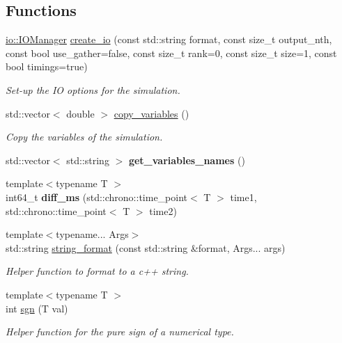 \subsection*{Functions}
\begin{DoxyCompactItemize}
\item 
\mbox{\hyperlink{classwash_1_1io_1_1IOManager}{io\+::\+I\+O\+Manager}} \mbox{\hyperlink{namespacewash_a92e4e768dbd609eba32fc0d68977d42f}{create\+\_\+io}} (const std\+::string format, const size\+\_\+t output\+\_\+nth, const bool use\+\_\+gather=false, const size\+\_\+t rank=0, const size\+\_\+t size=1, const bool timings=true)
\begin{DoxyCompactList}\small\item\em Set-\/up the IO options for the simulation. \end{DoxyCompactList}\item 
std\+::vector$<$ double $>$ \mbox{\hyperlink{namespacewash_afb1cc65bb4ecf6112723b4fb95450c96}{copy\+\_\+variables}} ()
\begin{DoxyCompactList}\small\item\em Copy the variables of the simulation. \end{DoxyCompactList}\item 
\mbox{\label{namespacewash_aebd88baa23220ce7842c503157c0bb71}} 
std\+::vector$<$ std\+::string $>$ {\bfseries get\+\_\+variables\+\_\+names} ()
\item 
\mbox{\label{namespacewash_a1c8fa60f6e44bc34cd82b152c9570603}} 
{\footnotesize template$<$typename T $>$ }\\int64\+\_\+t {\bfseries diff\+\_\+ms} (std\+::chrono\+::time\+\_\+point$<$ T $>$ time1, std\+::chrono\+::time\+\_\+point$<$ T $>$ time2)
\item 
{\footnotesize template$<$typename... Args$>$ }\\std\+::string \mbox{\hyperlink{namespacewash_a3c692ea6f1cb04614c790fd4b9dc34ba}{string\+\_\+format}} (const std\+::string \&format, Args... args)
\begin{DoxyCompactList}\small\item\em Helper function to format to a c++ string. \end{DoxyCompactList}\item 
{\footnotesize template$<$typename T $>$ }\\int \mbox{\hyperlink{namespacewash_a706d6d30508a81b6b9f25494cd759dff}{sgn}} (T val)
\begin{DoxyCompactList}\small\item\em Helper function for the pure sign of a numerical type. \end{DoxyCompactList}\item 

\end{DoxyCompactItemize}

